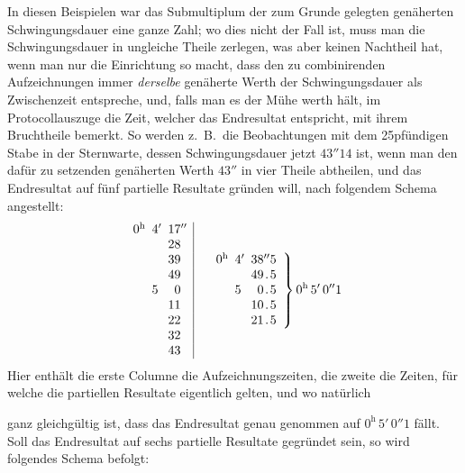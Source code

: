 In diesen Beispielen war das Submultiplum der zum Grunde gelegten genäherten Schwingungsdauer eine ganze Zahl; wo dies nicht der Fall ist, muss man die Schwingungsdauer in ungleiche Theile zerlegen, was aber keinen Nachtheil hat, wenn man nur die Einrichtung so macht, dass den zu combinirenden Aufzeichnungen immer \textit{derselbe} genäherte Werth der Schwingungsdauer als Zwischenzeit entspreche, und, falls man es der Mühe werth hält, im Protocollauszuge die Zeit, welcher das Endresultat entspricht, mit ihrem Bruchtheile bemerkt. So werden z.\ B.\ die Beobachtungen mit dem 25pfündigen Stabe in der Sternwarte, dessen Schwingungsdauer jetzt $43''14$ ist, wenn man den dafür zu setzenden genäherten Werth $43''$ in vier Theile abtheilen, und das Endresultat auf fünf partielle Resultate gründen will, nach folgendem Schema angestellt:
\[
\begin{array}{r@{}l@{\enspace}r@{}l@{\enspace}r@{}l|}
0&{}^{\mathrm h}&4&{}'&17&{}''\\
&&&&28&\\
&&&&39&\\
&&&&49&\\
&&5&&0&\\
&&&&11&\\
&&&&22&\\
&&&&32&\\
&&&&43&
\end{array}\quad
\left.\begin{array}{r@{}l@{\enspace}r@{}l@{\enspace}r@{}c@{}r}
0&{}^{\mathrm h}&4&{}'&38&{}''&5\\
&&&&49&{}.&5\\
&&5&&0&{}.&5\\
&&&&10&{}.&5\\
&&&&21&{}.&5
\end{array}\right\}0^{\mathrm h}\,5'\,0''1
\]
Hier enthält die erste Columne die Aufzeichnungszeiten, die zweite die Zeiten, für welche die partiellen Resultate eigentlich gelten, und wo natürlich
\par\clearpage
{}
\noindent ganz gleichgültig ist, dass das Endresultat genau genommen auf $0^{\mathrm h}\,5'\,0''1$ fällt. Soll das Endresultat auf sechs partielle Resultate gegründet sein, so wird folgendes Schema befolgt:
